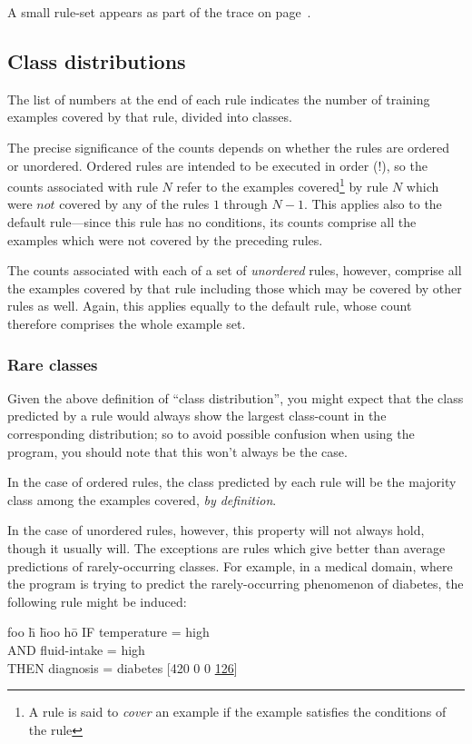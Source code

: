   A small rule-set appears as part of the trace on 
page~\pageref{little_rules}.

\subsection{Class distributions}
\label{distributions}
The list of numbers at the end of each rule indicates the 
number of training examples covered by that rule, divided into
classes.

The precise significance of the counts depends on whether
the rules are ordered or unordered.  Ordered rules are
intended to be executed in order (!), so the counts 
associated with rule $N$ refer to the examples 
covered\footnote{A rule is said to {\it cover} an example if the 
example satisfies the conditions of the rule}
by rule $N$ which were $not$ covered by any of the rules
$1$ through $N-1$.  This applies also to the default rule---since
this rule has no conditions, its counts comprise all
the examples which were not covered by the preceding rules.

The counts associated with each of a set of {\it unordered}
rules, however, comprise all the examples covered by that rule
including those which may be covered by other rules as well.
Again, this applies equally to the default rule, whose count
therefore comprises the whole example set.

\subsubsection{Rare classes}
Given the above definition of ``class distribution'', you
might expect that the class predicted by a rule would always
show the largest class-count in the corresponding distribution; 
so to avoid possible confusion when using the program, you should
note that this won't always be the case.

In the case of ordered rules, the class predicted by each rule 
will be the majority class among the examples covered, 
{\it by definition}.

In the case of unordered rules, however, this property will not
always hold, though it usually will.  The exceptions are rules
which give better than average predictions of rarely-occurring
classes.  For example, in a medical domain, where the program 
is trying to predict the rarely-occurring phenomenon of 
diabetes, the following rule might be induced:


\begin{tabbing}
foo \= h \= hoo ho\= \kill
\> IF \>\>     temperature = high \\
\> \>  AND \>   fluid-intake = high  \\
\> THEN \>\>   diagnosis = diabetes [420 0 0 \underline{126}]
\end{tabbing}


